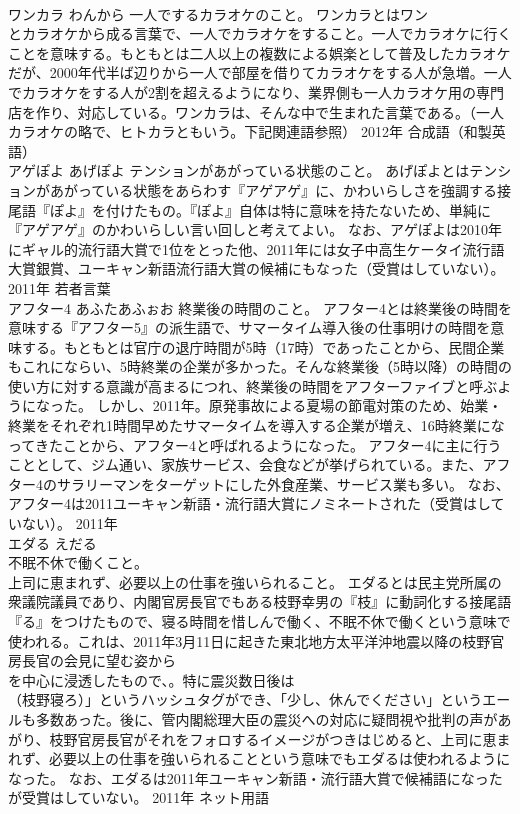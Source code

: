 \documentclass[8pt]{extreport}
\begin{document}
\begin{CJK}{UTF8}{min}
\\	ワンカラ	わんから	一人でするカラオケのこと。	ワンカラとはワン
\\	とカラオケから成る言葉で、一人でカラオケをすること。一人でカラオケに行くことを意味する。もともとは二人以上の複数による娯楽として普及したカラオケだが、2000年代半ば辺りから一人で部屋を借りてカラオケをする人が急増。一人でカラオケをする人が2割を超えるようになり、業界側も一人カラオケ用の専門店を作り、対応している。ワンカラは、そんな中で生まれた言葉である。（一人カラオケの略で、ヒトカラともいう。下記関連語参照）	2012年	合成語（和製英語）	
\\	アゲぽよ	あげぽよ	テンションがあがっている状態のこと。	あげぽよとはテンションがあがっている状態をあらわす『アゲアゲ』に、かわいらしさを強調する接尾語『ぽよ』を付けたもの。『ぽよ』自体は特に意味を持たないため、単純に『アゲアゲ』のかわいらしい言い回しと考えてよい。 なお、アゲぽよは2010年にギャル的流行語大賞で1位をとった他、2011年には女子中高生ケータイ流行語大賞銀賞、ユーキャン新語流行語大賞の候補にもなった（受賞はしていない）。	2011年	若者言葉	
\\	アフター4	あふたあふぉお	終業後の時間のこと。	アフター4とは終業後の時間を意味する『アフター5』の派生語で、サマータイム導入後の仕事明けの時間を意味する。もともとは官庁の退庁時間が5時（17時）であったことから、民間企業もこれにならい、5時終業の企業が多かった。そんな終業後（5時以降）の時間の使い方に対する意識が高まるにつれ、終業後の時間をアフターファイブと呼ぶようになった。 しかし、2011年。原発事故による夏場の節電対策のため、始業・終業をそれぞれ1時間早めたサマータイムを導入する企業が増え、16時終業になってきたことから、アフター4と呼ばれるようになった。 アフター4に主に行うこととして、ジム通い、家族サービス、会食などが挙げられている。また、アフター4のサラリーマンをターゲットにした外食産業、サービス業も多い。 なお、アフター4は2011ユーキャン新語・流行語大賞にノミネートされた（受賞はしていない）。	2011年	
\\	エダる	えだる	
\\	不眠不休で働くこと。 
\\	上司に恵まれず、必要以上の仕事を強いられること。	エダるとは民主党所属の衆議院議員であり、内閣官房長官でもある枝野幸男の『枝』に動詞化する接尾語『る』をつけたもので、寝る時間を惜しんで働く、不眠不休で働くという意味で使われる。これは、2011年3月11日に起きた東北地方太平洋沖地震以降の枝野官房長官の会見に望む姿から
\\	を中心に浸透したもので、。特に震災数日後は
\\	（枝野寝ろ）」というハッシュタグができ、「少し、休んでください」というエールも多数あった。後に、管内閣総理大臣の震災への対応に疑問視や批判の声があがり、枝野官房長官がそれをフォロするイメージがつきはじめると、上司に恵まれず、必要以上の仕事を強いられることという意味でもエダるは使われるようになった。 なお、エダるは2011年ユーキャン新語・流行語大賞で候補語になったが受賞はしていない。	2011年	ネット用語	

\end{CJK}
\end{document}
